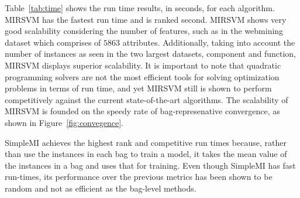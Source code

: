 \documentclass[preprint,12pt]{elsarticle}
\begin{document}
\begin{table}[t!]
{}\vspace{-1.2em}
\label{fig:BonfDunnpmeta}
\end{table}
Table~\ref{tab:time} shows the run time results, in seconds, for each algorithm. MIRSVM has the fastest run time and is ranked second. MIRSVM shows very good scalability considering the number of features, such as in the webmining dataset which comprises of $5863$ attributes. Additionally, taking into account the number of instances as seen in the two largest datasets, component and function, MIRSVM displays superior scalability. It is important to note that quadratic programming solvers are not the most efficient tools for solving optimization problems in terms of run time, and yet MIRSVM still is shown to perform competitively against the current state-of-the-art algorithms. The scalability of MIRSVM is founded on the speedy rate of bag-represenative convergence, as shown in Figure~\ref{fig:convegence}.

SimpleMI achieves the highest rank and competitive run times because, rather than use the instances in each bag to train a model, it takes the mean value of the instances in a bag and uses that for training. Even though SimpleMI has fast run-times, its performance over the previous metrics has been shown to be random and not as efficient as the bag-level methods.
\end{document}
